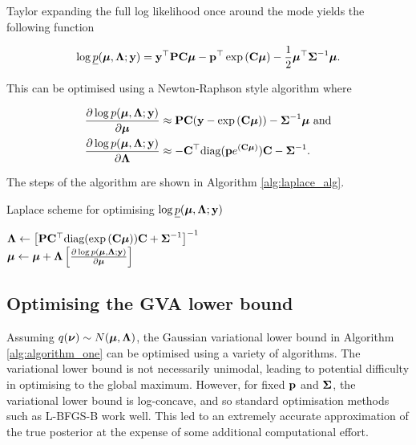 \documentclass{article}[12pt]
\begin{document}

Taylor expanding the full log likelihood once around the mode yields the following function

\begin{align*}
\log \underline{p}({\boldsymbol \mu}, {\boldsymbol \Lambda}; {\bf y}) = {\bf y}^\top{\bf P}{\bf C}{\boldsymbol\mu} - {\bf p}^\top\exp \left ({\bf C} {\boldsymbol \mu} \right ) - {\frac{1}{2}} {\boldsymbol \mu}^\top {\boldsymbol\Sigma}^{-1} {\boldsymbol \mu}.
\end{align*}

This can be optimised using a Newton-Raphson style algorithm where

\begin{align*}
\frac{\partial \log p({\boldsymbol \mu}, {\boldsymbol \Lambda}; {\bf y})}{\partial {\boldsymbol\mu}} &\approx {\bf P} {\bf C} ({\bf y} - \exp{({\bf C}{\boldsymbol\mu})}) - {\boldsymbol \Sigma}^{-1} {\boldsymbol \mu} \text{ and} \\
\frac{\partial \log p({\boldsymbol \mu}, {\boldsymbol \Lambda}; {\bf y})}{\partial {\boldsymbol\Lambda}} &\approx - {\bf C}^\top \text{diag}({\bf p} e^{({\bf C} {\boldsymbol \mu})}) {\bf C} - {\boldsymbol \Sigma}^{-1}.
\end{align*}

The steps of the algorithm are shown in Algorithm \ref{alg:laplace_alg}.

\begin{algorithm}
\caption{Laplace scheme for optimising $\log \underline{p}({\boldsymbol \mu}, {\boldsymbol \Lambda}; {\bf y})$}
\label{alg:laplace_alg}
\begin{algorithmic}
\STATE ${\boldsymbol \Lambda} \leftarrow \left [{\bf P} {\bf C}^\top \text{diag}(\exp{({\bf C}{\boldsymbol\mu})}) {\bf C} + {\boldsymbol \Sigma}^{-1} \right ]^{-1}$ \\ [1ex] 
\STATE ${\boldsymbol \mu} \leftarrow {\boldsymbol\mu} + {\boldsymbol \Lambda} \left [ \frac{\partial \log p({\boldsymbol \mu}, {\boldsymbol \Lambda}; {\bf y})}{\partial {\boldsymbol\mu}} \right ]$ \\ [1ex]
\ENDWHILE
\end{algorithmic}
\end{algorithm}

\subsection{Optimising the GVA lower bound}


Assuming $q({\boldsymbol \nu}) \sim N({\boldsymbol \mu}, {\boldsymbol \Lambda})$, the Gaussian variational lower bound in Algorithm
\ref{alg:algorithm_one} can be optimised using a variety of algorithms. The variational lower bound is not
necessarily unimodal, leading to potential difficulty in optimising to the global maximum. However, for fixed
${\bf p}$ and ${\boldsymbol \Sigma}$, the variational lower bound is log-concave, and so standard optimisation methods such as
L-BFGS-B work well. This led to an extremely accurate approximation of the true posterior at the expense of
some additional computational effort.
\end{document}
